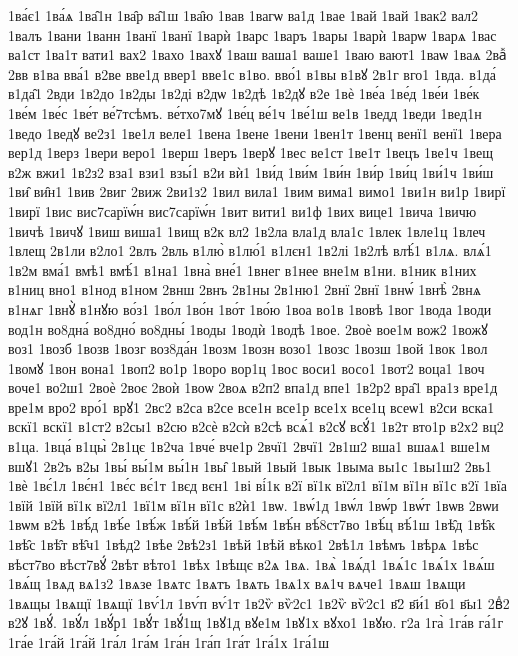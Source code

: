 {1ва́є1
1ва́ѧ
1ва̑1н
1ва̑р
ва̑1ш
1ва̑ю
1вав
1вагѡ
ва1д
1вае
1вай
1вай
1вак2
вал2
1валъ
1вани
1ванн
1ванї
1ванї
1варѝ
1варс
1варъ
1вары
1варѝ
1варѡ
1варѧ
1вас
ва1ст
1ва1т
вати1
вах2
1вахо
1вахꙋ
1ваш
ваша1
ваше1
1ваю
вают1
1ваѡ
1ваѧ
2ваⷤ
2вв
в1ва
вва́1
в2ве
вве1д
ввер1
вве1с
в1во.
вво́1
в1вы
в1вꙋ
2в1г
вго1
1вда.
в1да́
в1да̑1
2вди
1в2до
1в2ды
1в2ді
в2дѡ
1в2дѣ
1в2дꙋ
в2е
1вѐ
1ве́а
1ве́д
1ве́и
1ве́к
1ве́м
1ве́с
1ве́т
ве́7тсѣмъ.
ве́тхо7мꙋ
1ве́ц
ве́1ч
1ве́1ш
ве1в
1ведд
1веди
1вед1н
1ведо
1ведꙋ
ве2з1
1ве1л
веле1
1вена
1вене
1вени
1вен1т
1венц
венї1
венї1
1вера
вер1д
1верз
1вери
веро1
1верш
1веръ
1верꙋ
1вес
ве1ст
1ве1т
1вецъ
1ве1ч
1вещ
в2ж
вжи1
1в2з2
вза1
взи1
взы́1
в2и
вѝ1
1ви́д
1ви́м
1ви́н
1ви́р
1ви́ц
1ви́1ч
1ви́ш
1ви̑
ви̑н1
1вив
2виг
2виж
2ви1з2
1вил
вила1
1вим
вима1
вимо1
1ви1н
ви1р
1вирї
1вирї
1вис
вис7сарїѡ́н
вис7сарїѡ́н
1вит
вити1
ви1ф
1вих
вице1
1вича
1вичю
1вичѣ
1вичꙋ
1виш
виша1
1вищ
в2к
вл2
1в2ла
вла1д
вла1с
1влек
1вле1ц
1влеч
1влещ
2в1ли
в2ло1
2влъ
2вль
в1лю̀
в1лю́1
в1лєн1
1в2лі
1в2лѣ
влѣ́1
в1лѧ.
влѧ́1
1в2м
вма́1
вмѣ1
вмѣ́1
в1на1
1вна̀
вне́1
1внег
в1нее
вне1м
в1ни.
в1ник
в1них
в1ниц
вно1
в1нод
в1ном
2внш
2внъ
2в1ны
2в1ню1
2внї
2внї
1внѡ́
1внѣ̀
2внѧ
в1нѧг
1внꙋ̀
в1нꙋю
во́з1
1во́л
1во́н
1во́т
1во́ю
1воа
во1в
1вовѣ
1вог
1вода
1води
вод1н
во8дна́
во8дно́
во8дны́
1воды
1водѝ
1водѣ
1вое.
2воѐ
вое1м
вож2
1вожꙋ
воз1
1возб
1возв
1возг
воз8да́н
1возм
1возн
возо1
1возс
1возш
1вой
1вок
1вол
1вомꙋ
1вон
вона1
1воп2
во1р
1воро
вор1ц
1вос
воси1
восо1
1вот2
воца1
1воч
воче1
во2ш1
2воѐ
2воє
2воѝ
1воѡ
2воѧ
в2п2
впа1д
впе1
1в2р2
вра̑1
вра1з
вре1д
вре1м
вро2
вро́1
врꙋ1
2вс2
в2са
в2се
все1н
все1р
все1х
все1ц
всеѡ1
в2си
вска1
вскї1
вскї1
в1ст2
в2сы1
в2сю
в2сѐ
в2сѝ
в2сѣ
всѧ́1
в2сꙋ
всꙋ́1
1в2т
вто1р
в2х2
вц2
в1ца.
1вца́
в1цы̀
2в1цє
1в2ча
1вче́
вче1р
2вчї1
2вчї1
2в1ш2
вша1
вшаѧ1
вше1м
вшꙋ1
2в2ъ
в2ы
1вы́
вы́1м
вы́1н
1вы̑
1вый
1вый
1вык
1выма
вы1с
1вы1ш2
2вь1
1вѐ
1вє́1л
1вє́н1
1вє́с
вє́1т
1вєд
вєн1
1ві
ві́1к
в2ї
вї1к
вї2л1
вї1м
вї1н
вї1с
в2ї
1вїа
1вїй
1вїй
вї1к
вї2л1
1вї1м
вї1н
вї1с
в2ѝ1
1вѡ.
1вѡ́1д
1вѡ́л
1вѡ́р
1вѡ́т
1вѡв
2вѡи
1вѡм
в2ѣ
1вѣ́д
1вѣ́е
1вѣ́ж
1вѣ́й
1вѣ́й
1вѣ́м
1вѣ́н
вѣ́8ст7во
1вѣ́ц
вѣ́1ш
1вѣ̑д
1вѣ̑к
1вѣ̑с
1вѣ̑т
вѣ̑ч1
1вѣд2
1вѣе
2вѣ2з1
1вѣй
1вѣй
вѣко1
2вѣ1л
1вѣмъ
1вѣрѧ
1вѣс
вѣст7во
вѣст7вꙋ́
2вѣт
вѣто1
1вѣх
1вѣщє
в2ѧ
1вѧ.
1вѧ̀
1вѧ́д1
1вѧ́1с
1вѧ́1х
1вѧ́ш
1вѧ́щ
1вѧд
вѧ1з2
1вѧзе
1вѧтс
1вѧтъ
1вѧть
1вѧ1х
вѧ1ч
вѧче1
1вѧш
1вѧщи
1вѧщы
1вѧщї
1вѧщї
1вѵ́1л
1вѵ́п
вѵ́1т
1в2ѷ
вѷ2с1
1в2ѷ
вѷ2с1
в҃2
в҃и́1
в҃о1
в҃ы1
2вⷣ2
в2ꙋ
1вꙋ́.
1вꙋ́л
1вꙋ́р1
1вꙋ́т
1вꙋ́1щ
1вꙋ1д
вꙋе1м
1вꙋ1х
вꙋхо1
1вꙋю.
г2а
1га̀
1га́в
га́1г
1га́е
1га́й
1га́й
1га́л
1га́м
1га́н
1га́п
1га́т
1га́1х
1га́1ш
}
